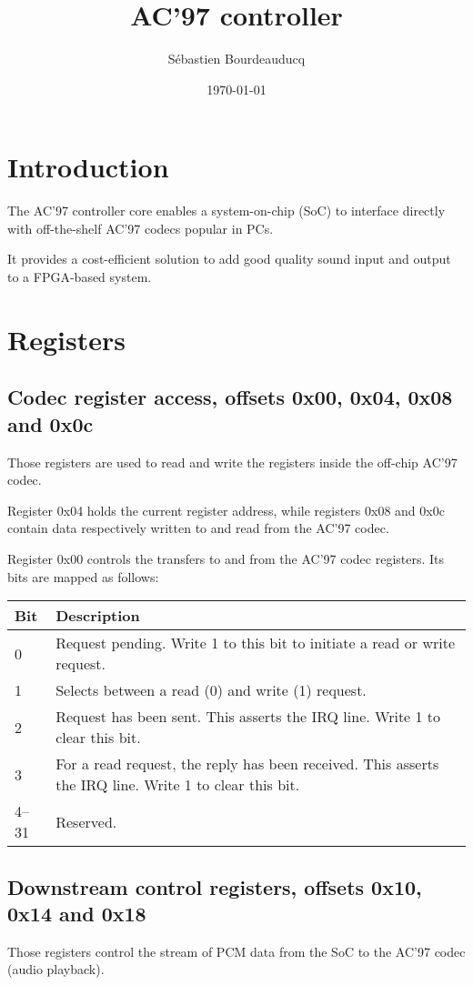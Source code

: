 \documentclass[a4paper,11pt]{article}
\title{AC'97 controller}
\author{S\'ebastien Bourdeauducq}
\date{\today}
\begin{document}
\maketitle{}
\section{Introduction}
The AC'97 controller core enables a system-on-chip (SoC) to interface directly with off-the-shelf AC'97 codecs popular in PCs.

It provides a cost-efficient solution to add good quality sound input and output to a FPGA-based system.

\section{Registers}
\subsection{Codec register access, offsets 0x00, 0x04, 0x08 and 0x0c}
Those registers are used to read and write the registers inside the off-chip AC'97 codec.

Register 0x04 holds the current register address, while registers 0x08 and 0x0c contain data respectively written to and read from the AC'97 codec.

Register 0x00 controls the transfers to and from the AC'97 codec registers. Its bits are mapped as follows:\\
\begin{tabularx}{\textwidth}{|l|X|}
\hline
\textbf{Bit} & \textbf{Description} \\
\hline
0 & Request pending. Write 1 to this bit to initiate a read or write request. \\
\hline
1 & Selects between a read (0) and write (1) request. \\
\hline
2 & Request has been sent. This asserts the IRQ line. Write 1 to clear this bit. \\
\hline
3 & For a read request, the reply has been received. This asserts the IRQ line. Write 1 to clear this bit. \\
\hline
4--31 & Reserved. \\
\hline
\end{tabularx}

\subsection{Downstream control registers, offsets 0x10, 0x14 and 0x18}
Those registers control the stream of PCM data from the SoC to the AC'97 codec (audio playback).
\end{document}

